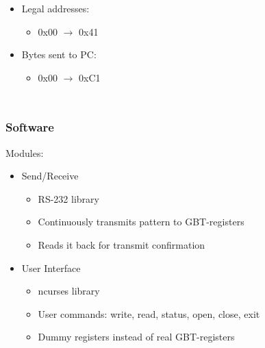 \documentclass[aspectratio=43]{beamer}
\begin{document}
{\begin{frame}[t]
\begin{columns}[c]
\begin{itemize}
\item Legal addresses:
	\begin{itemize}
	\item 0x00 $\rightarrow$ 0x41
	\end{itemize}
\item Bytes sent to PC:
	\begin{itemize}
	\item 0x00 $\rightarrow$ 0xC1
	\end{itemize}	
\end{itemize}

\end{columns}

\end{frame}

\begin{frame}
\frametitle{Software}

\Large Modules:\\
\normalsize
\begin{itemize}
\item Send/Receive
	\begin{itemize}
	\item RS-232 library
	\item Continuously transmits pattern to GBT-registers
	\item Reads it back for transmit confirmation
	\end{itemize}
\item User Interface
	\begin{itemize}
	\item ncurses library
	\item User commands: write, read, status, open, close, exit
	\item Dummy registers instead of real GBT-registers
	\end{itemize}
\end{itemize}

\end{frame}

}
\end{document}
